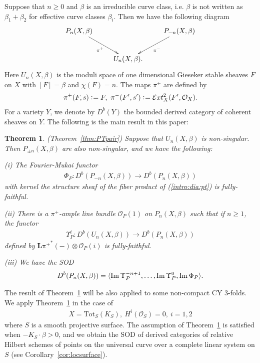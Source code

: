 \documentclass[11pt]{amsart}
\theoremstyle{plain}
\newtheorem{thm}{Theorem}[section]
\newcommand{\eE}{\mathcal{E}}
\newcommand{\oO}{\mathcal{O}}
\newcommand{\dL}{\mathbf{L}}
\newcommand{\Imm}{\mathop{\rm Im}\nolimits}
\begin{document}
Suppose that
$n\ge 0$ and $\beta$ is an irreducible curve class, i.e. 
$\beta$ is not written as $\beta_1+\beta_2$ for 
effective curve classes $\beta_i$. 
Then we have the following diagram
\begin{align}\label{intro:dia:pt}
\xymatrix{
P_n(X, \beta) \ar[rd]_-{\pi^+} & & P_{-n}(X, \beta) \ar[ld]^-{\pi^-} \\
& U_n(X, \beta). &
}
\end{align}
Here $U_n(X, \beta)$ is the moduli space of one dimensional 
Gieseker stable sheaves $F$ on $X$ with $[F]=\beta$
and $\chi(F)=n$.
The maps $\pi^{\pm}$ are defined by 
\begin{align*}
\pi^+(F, s) \cneq F, \ 
\pi^-(F', s') \cneq \eE xt^2_X(F', \oO_X). 
\end{align*}
For a variety $Y$, we denote by $D^b(Y)$ the 
bounded derived category of coherent sheaves on $Y$. 
The following is the main result in this paper: 
\begin{thm}\label{intro:thm:PT}\emph{(Theorem~\ref{thm:PTpair})}
Suppose that $U_n(X, \beta)$ is non-singular. 
Then $P_{\pm n}(X, \beta)$ are also non-singular, and 
we have the following: 

(i) 
The Fourier-Mukai functor
\begin{align*}
\Phi_P  
 \colon D^b(P_{-n}(X, \beta)) \to D^b(P_n(X, \beta))
\end{align*}
with kernel 
the structure sheaf of the fiber product of (\ref{intro:dia:pt})
is fully-faithful. 

(ii) There is a $\pi^{+}$-ample line bundle 
$\oO_P(1)$ on $P_n(X, \beta)$ such that 
if $n\ge 1$, the functor
\begin{align*}
\Upsilon^i_P \colon D^b(U_n(X, \beta)) \to D^b(P_n(X, \beta))
\end{align*}
defined by $\dL\mathrm{\pi^+}^{\ast}(-) \otimes \oO_P(i)$ is
 fully-faithful. 

(iii) We have the SOD
\begin{align}\label{intro:P:SOD}
D^b(P_n(X, \beta))=
\langle \Imm \Upsilon_P^{-n+1}, \ldots, \Imm \Upsilon_P^{0}, \Imm \Phi_P
 \rangle.
\end{align}
\end{thm}

The result of Theorem~\ref{intro:thm:PT}
will be also applied to some non-compact CY 3-folds. 
We apply Theorem~\ref{intro:thm:PT} in the case 
of 
\begin{align*}
X=\mathrm{Tot}_S(K_S), \ H^i(\oO_S)=0, \ i=1, 2
\end{align*}
where $S$ is a smooth projective surface. 
The assumption of Theorem~\ref{intro:thm:PT}
is satisfied when $-K_S \cdot \beta>0$, and we obtain 
the SOD of derived categories of
relative Hilbert schemes of points on
the universal curve over a complete linear system
on $S$
(see Corollary~\ref{cor:locsurface}).
\end{document}
